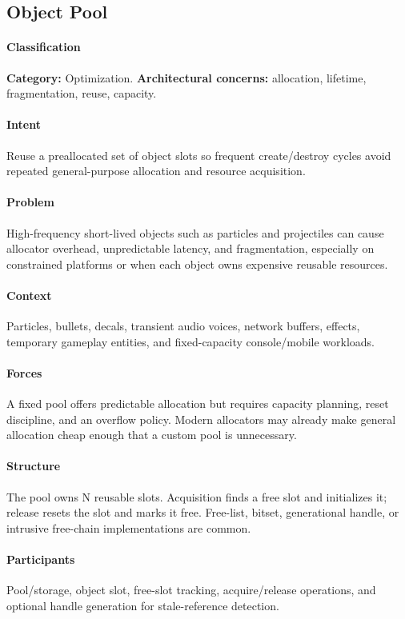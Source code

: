 \documentclass[11pt]{article}
\begin{document}
\subsection{Object Pool}\label{pat:object-pool}
\paragraph{Classification} \textbf{Category:} Optimization. \textbf{Architectural concerns:} allocation, lifetime, fragmentation, reuse, capacity.
\paragraph{Intent} Reuse a preallocated set of object slots so frequent create/destroy cycles avoid repeated general-purpose allocation and resource acquisition.
\paragraph{Problem} High-frequency short-lived objects such as particles and projectiles can cause allocator overhead, unpredictable latency, and fragmentation, especially on constrained platforms or when each object owns expensive reusable resources.
\paragraph{Context} Particles, bullets, decals, transient audio voices, network buffers, effects, temporary gameplay entities, and fixed-capacity console/mobile workloads.
\paragraph{Forces} A fixed pool offers predictable allocation but requires capacity planning, reset discipline, and an overflow policy. Modern allocators may already make general allocation cheap enough that a custom pool is unnecessary.
\paragraph{Structure} The pool owns N reusable slots. Acquisition finds a free slot and initializes it; release resets the slot and marks it free. Free-list, bitset, generational handle, or intrusive free-chain implementations are common.
\paragraph{Participants} Pool/storage, object slot, free-slot tracking, acquire/release operations, and optional handle generation for stale-reference detection.
\end{document}
